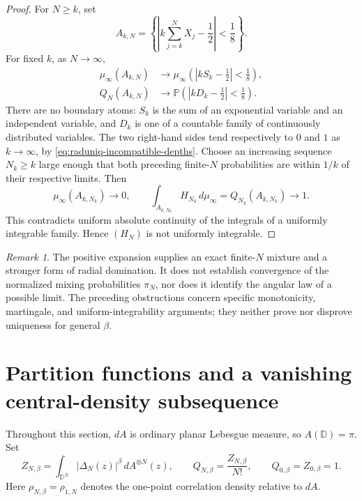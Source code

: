 \documentclass[11pt,a4paper]{article}
\numberwithin{equation}{section}
\theoremstyle{definition}
\theoremstyle{remark}
\newtheorem{remark}[theorem]{Remark}
\begin{document}
\begin{proof}
For $N\ge k$, set
\[
 A_{k,N}=\left\{
 \left|k\sum_{j=k}^N X_j-\frac12\right|<\frac18\right\}.
\]
For fixed $k$, as $N\to\infty$,
\begin{align*}
 \mu_\infty(A_{k,N})
 &\longrightarrow
 \mu_\infty\left(\left|kS_k-\frac12\right|<\frac18\right),\\
 Q_N(A_{k,N})
 &\longrightarrow
 \mathbb P\left(\left|kD_k-\frac12\right|<\frac18\right).
\end{align*}
There are no boundary atoms: $S_k$ is the sum of an exponential
variable and an independent variable, and $D_k$ is one of a countable
family of continuously distributed variables. The two right-hand
sides tend respectively to $0$ and $1$ as $k\to\infty$, by
\eqref{eq:raduniq-incompatible-depths}. Choose an increasing sequence
$N_k\ge k$ large enough that both preceding finite-$N$ probabilities
are within $1/k$ of their respective limits. Then
\[
 \mu_\infty(A_{k,N_k})\longrightarrow0,
 \qquad
 \int_{A_{k,N_k}}H_{N_k}\,d\mu_\infty
 =Q_{N_k}(A_{k,N_k})\longrightarrow1.
\]
This contradicts uniform absolute continuity of the integrals of a
uniformly integrable family. Hence $(H_N)$ is not uniformly integrable.
\end{proof}

\begin{remark}
The positive expansion supplies an exact finite-$N$ mixture and a
stronger form of radial domination. It does not establish convergence
of the normalized mixing probabilities $\pi_N$, nor does it identify
the angular law of a possible limit. The preceding obstructions concern
specific monotonicity, martingale, and uniform-integrability arguments;
they neither prove nor disprove uniqueness for general $\beta$.
\end{remark}



\section{Partition functions and a vanishing central-density subsequence}

Throughout this section, $dA$ is ordinary planar Lebesgue measure, so
$A(\mathbb D)=\pi$.  Set
\[
 Z_{N,\beta}=\int_{\mathbb D^N}|\Delta_N(z)|^\beta\,dA^{\otimes N}(z),
 \qquad Q_{N,\beta}=\frac{Z_{N,\beta}}{N!},
 \qquad Q_{0,\beta}=Z_{0,\beta}=1.
\]
Here $\rho_{N,\beta}=\rho_{1,N}$ denotes
the one-point correlation density relative to $dA$.
\end{document}
